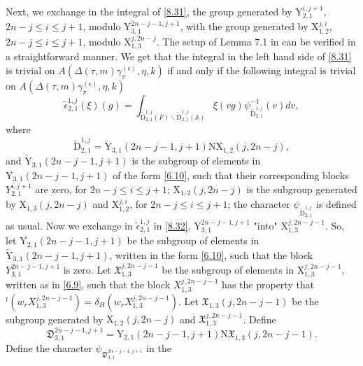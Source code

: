 \documentclass[12pts]{amsart}
\newcommand{\BA}{{\mathbb {A}}}
\begin{document}
Next, we exchange in the integral of \eqref{8.31}, the group
generated by $\mathrm{Y}_{2,1}^{i,j+1}$, $2n-j\leq i\leq j+1$, modulo
$\mathrm{Y}_{3,1}^{2n-j-1,j+1}$, with the group generated by
$\mathrm{X}_{1,2}^{j,i}$, $2n-j\leq i\leq j+1$, modulo
$\mathrm{X}_{1,3}^{j,2n-j}$. The setup of Lemma 7.1 in \cite{GRS11} can
be verified in a straightforward manner. We get that the integral in
the left hand side of \eqref{8.31} is trivial on $A(\Delta(\tau,m)\gamma_\pi^{(\epsilon)},\eta,k)$ if
and only if the following integral is trivial on $A(\Delta(\tau,m)\gamma_\pi^{(\epsilon)},\eta,k)$
\begin{equation}\label{8.32}
\widetilde{\epsilon}_{2,1}^{1,j}(\xi)(g)=\int_{\widetilde{\mathrm{D}}_{2,1}^{1,j}(F)\backslash
	\widetilde{\mathrm{D}}_{2,1}^{1,j}(\BA)}\xi(vg)\psi_{\widetilde{\mathrm{D}}_{2,1}^{1,j}}^{-1}(v)dv,
\end{equation}
where
\begin{equation}\label{8.33}
\widetilde{\mathrm{D}}_{2,1}^{1,j}=\widetilde{\mathrm{Y}}_{3,1}(2n-j-1,j+1)\mathrm{N}\mathrm{X}_{1,2}(j,2n-j),
\end{equation}
and $\widetilde{\mathrm{Y}}_{3,1}(2n-j-1,j+1)$ is the subgroup of
elements in $\mathrm{Y}_{3,1}(2n-j-1,j+1)$ of the form \eqref{6.10},
such that their corresponding blocks $Y_{2,1}^{i,j+1}$ are zero, for
$2n-j\leq i\leq j+1$; $\mathrm{X}_{1,2}(j,2n-j)$ is the subgroup
generated by $\mathrm{X}_{1,3}(j,2n-j)$ and
$\mathrm{X}_{1,2}^{j,i}$, for $2n-j\leq i\leq j+1$; the character
$\psi_{\widetilde{\mathrm{D}}_{2,1}^{1,j}}$ is defined as usual.
Now we exchange in $\widetilde{\epsilon}_{2,1}^{1,j}$ in
\eqref{8.32}, $\mathrm{Y}_{3,1}^{2n-j-1,j+1}$ "into"
$\mathrm{X}_{1,3}^{j,2n-j-1}$. So, let
$\mathrm{Y}_{2,1}(2n-j-1,j+1)$ be the subgroup of elements in
$\widetilde{\mathrm{Y}}_{3,1}(2n-j-1,j+1)$, written in the form
\eqref{6.10}, such that the block $Y_{3,1}^{2n-j-1,j+1}$ is zero.
Let $\mathfrak{X}_{1,3}^{j,2n-j-1}$ be the subgroup of elements in
$\mathrm{X}_{1,3}^{j,2n-j-1}$, written as in \eqref{6.9}, such that
the block $X_{1,3}^{j,2n-j-1}$ has the property that ${}^t(w_r
X_{1,3}^{j,2n-j-1})=\delta_H(w_rX_{1,3}^{j,2n-j-1})$. Let
$\mathfrak{X}_{1,3}(j,2n-j-1)$ be the subgroup generated by
$\mathrm{X}_{1,2}(j,2n-j)$ and $\mathfrak{X}_{1,3}^{j,2n-j-1}$.
Define
\begin{equation}\label{8.34}
\mathfrak{D}_{3,1}^{2n-j-1,j+1}=\mathrm{Y}_{2,1}(2n-j-1,j+1)\mathrm{N}\mathfrak{X}_{1,3}(j,2n-j-1).
\end{equation}
Define the character $\psi_{\mathfrak{D}_{3,1}^{2n-j-1,j+1}}$ in the
\end{document}
